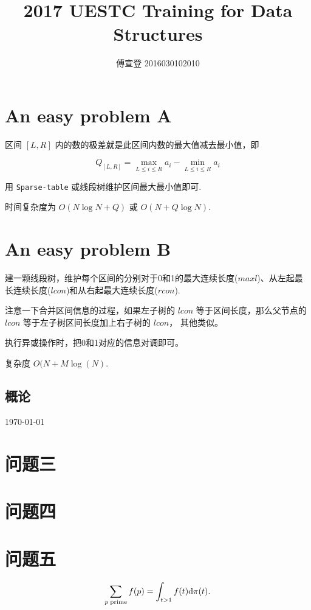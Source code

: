 \documentclass[fontset=windowsnew,zihao=-4,scheme=chinese,punct=quanjiao,linespread=1,UTF8]{ctexart}
\begin{document}
\title{2017 UESTC Training for Data Structures}
\author{傅宣登 2016030102010}

\maketitle

\section{An easy problem A}

区间 $[L,R]$ 内的数的极差就是此区间内数的最大值减去最小值，即

\[
Q_{[L,R]} = \max_{L\le i \le R}{a_i} - \min_{L\le i \le R}{a_i}
\]

用 \verb|Sparse-table| 或线段树维护区间最大最小值即可.

时间复杂度为 $O(N\log{N}+Q)$ 或 $O(N+Q\log{N})$.

\section{An easy problem B}

建一颗线段树，维护每个区间的分别对于0和1的最大连续长度($maxl$)、从左起最长连续长度($lcon$)和从右起最大连续长度($rcon$).

注意一下合并区间信息的过程，如果左子树的 $lcon$ 等于区间长度，那么父节点的 $lcon$ 等于左子树区间长度加上右子树的 $lcon$，
其他类似。

执行异或操作时，把0和1对应的信息对调即可。

复杂度 $O(N+M\log(N)$.

\subsection{概论}


\today \figurename

\section{问题三}


\section{问题四}

\section{问题五}
\[
  \sum_{p\rm\;prime}f(p) = \int_{t>1}f(t)\mathrm{d}\pi(t).
\]
\end{document}

